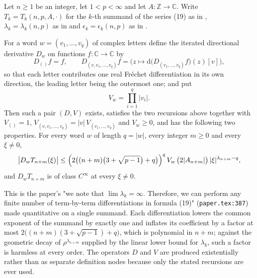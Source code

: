 \begin{helper}
Let $n\ge1$ be an integer, let $1<p<\infty$ and let
$A\colon\mathbb{Z}\to\mathbb{C}$.  Write $T_k=T_k(n,p,A,\cdot)$ for the $k$-th
summand of the series (19) as in , $\lambda_k=\lambda_k(n,p)$
as in  and $\epsilon_k=\epsilon_k(n,p)$ as in
.

For a word $w=(v_1,\dots,v_q)$ of complex letters define the iterated
directional derivative $D_w$ on functions $f\colon\mathbb{C}\to\mathbb{C}$ by
\[
  D_{()}f=f,\qquad
  D_{(v,v_1,\dots,v_q)}f=\bigl(z\mapsto \mathrm{d}\bigl(D_{(v_1,\dots,v_q)}f\bigr)(z)[v]\bigr),
\]
so that each letter contributes one real Fr\'echet differentiation in its own
direction, the leading letter being the outermost one; and put
\[
  V_w=\prod_{i=1}^{q}|v_i| .
\]
Then such a pair $(D,V)$ exists, satisfies the two recursions above together
with $V_{()}=1$, $V_{(v,v_1,\dots,v_q)}=|v|\,V_{(v_1,\dots,v_q)}$ and
$V_w\ge0$, and has the following two properties.  For every word $w$ of length
$q=|w|$, every integer $m\ge0$ and every $\xi\ne0$,
\[
  \bigl|D_wT_{n+m}(\xi)\bigr|
  \le\Bigl(2\bigl((n+m)\bigl(3+\sqrt{p-1}\bigr)+q\bigr)\Bigr)^{q}
      \,V_w\,\bigl(2|A_{n+m}|\bigr)\,
      |\xi|^{\lambda_{n+m}-q},
\]
and $D_wT_{n+m}$ is of class $C^\infty$ at every $\xi\ne0$.

This is the paper's "we note that $\lim\lambda_k=\infty$.  Therefore, we can
perform any finite number of term-by-term differentiations in formula (19)"
(\texttt{paper.tex:387}) made quantitative on a single summand.  Each
differentiation lowers the common exponent of the summand by exactly one and
inflates its coefficient by a factor at most
$2\bigl((n+m)(3+\sqrt{p-1})+q\bigr)$, which is polynomial in $n+m$; against
the geometric decay of $\rho^{\lambda_{n+m}}$ supplied by the linear lower
bound for $\lambda_k$, such a factor is harmless at every order.  The
operators $D$ and $V$ are produced existentially rather than as separate
definition nodes because only the stated recursions are ever used.
\end{helper}

